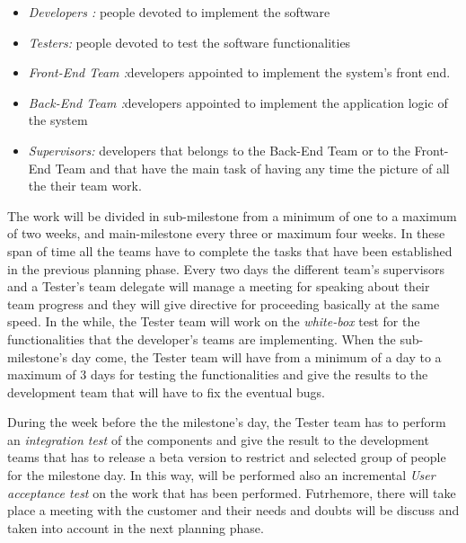 \begin{itemize}
	\item \emph{Developers :} people devoted to implement the software
	
	\item \emph{Testers: }people devoted to test the software functionalities
	
	\item \emph{Front-End Team :}developers appointed to implement the system’s front end.
	
	
	\item \emph{Back-End Team :}developers appointed to implement the application logic of the system
	
	\item \emph{Supervisors: }developers that belongs to the Back-End Team or to the Front-End Team and that have the main task of having any time the picture of all the their team work.

\end{itemize}


The work will be divided in sub-milestone from a minimum of one to a maximum of two weeks, and main-milestone every three or maximum four weeks. In these span of time all the teams have to complete the tasks that have been established in the previous planning phase. Every two days the different team's supervisors and a Tester’s team delegate will manage a meeting for speaking about their team progress and they will give directive for proceeding basically at the same speed. 
In the while, the Tester team will work on the \emph{white-box} test for the functionalities that the developer’s teams are implementing.
When the sub-milestone’s day come, the Tester team will have from a minimum of a day to a maximum of 3 days for testing the functionalities and give the results to the development team that will have to fix the eventual bugs.

During the week before the the milestone’s day, the Tester team has to perform an \emph{integration test} of the components and give the result to the development teams that has to release a beta version to restrict and selected group of people for the milestone day. In this way, will be performed also an incremental \emph{User acceptance test} on the work that has been performed. Futrhemore, there will take place a meeting with the customer and their needs and doubts will be discuss and taken into account in the next planning phase.

